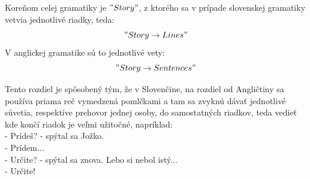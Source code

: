 \documentclass[12pt,a4paper]{report}
\theoremstyle{definition}
\theoremstyle{remark}
\begin{document}
\bigskip

Koreňom celej gramatiky je $"Story"$, z ktorého sa v prípade slovenskej gramatiky vetvia jednotlivé riadky, teda: $$"Story \to Lines "$$  V anglickej gramatike sú to jednotlivé vety: $$"Story \to Sentences "$$

Tento rozdiel je spôsobený tým, že v Slovenčine, na rozdiel od Angličtiny sa používa priama reč vymedzená pomlčkami a tam sa zvyknú dávať jednotlivé súvetia, respektíve prehovor jednej osoby, do samostatných riadkov, teda vedieť kde končí riadok je veľmi užitočné, napríklad: \\

\noindent - Prídeš? - spýtal sa Jožko.\\
- Prídem...\\
- Určite? - spýtal sa znova. Lebo si nebol istý...\\
- Určite! \\
\end{document}
